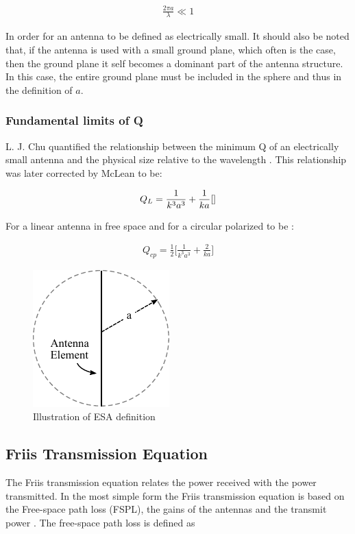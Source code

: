 \begin{align}
  \frac{2\pi a}{\lambda} \ll 1
\end{align}

In order for an antenna to be defined as electrically small. It should also be noted that, if the antenna is used with a small ground plane, which often is the case, then the ground plane it self becomes a dominant part of the antenna structure. In this case, the entire ground plane must be included in the sphere and thus in the definition of $a$. \cite{} 


\subsubsection{Fundamental limits of Q}
L. J. Chu quantified the relationship between the minimum Q of an electrically small antenna and the physical size relative to the wavelength \cite{}. This relationship was later corrected by McLean \cite{}to be: 

\begin{align}
  Q_L = \frac{1}{k^3a^3}+ \frac{1}{ka} \cite{}
\end{align}

For a linear antenna in free space and for a circular polarized to be \cite{}:  

\begin{align}
  Q_{cp} = \frac{1}{2} \Big[ \frac{1}{k^3a^3} + \frac{2}{ka} \Big] 
\end{align}


\begin{figure}[htbp]
  \centering
  \includegraphics[scale=1]{img/analysis/ESA}
  \caption{Illustration of ESA definition \cite{}}
  \label{fig:ant-esa-def}
\end{figure}

\subsection{Friis Transmission Equation}
The Friis transmission equation relates the power received with the power transmitted. In the most simple form the Friis transmission equation is based on the Free-space path loss (FSPL), the gains of the antennas and the transmit power \cite{}. The free-space path loss is defined as \cite{}

